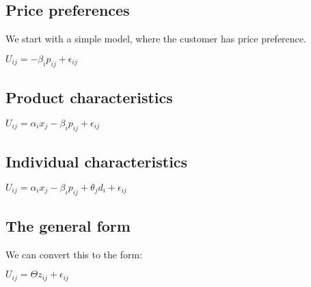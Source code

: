 
\subsection{Price preferences}

We start with a simple model, where the customer has price preference.

\(U_{ij}=-\beta_i p_{ij} +\epsilon_{ij}\)

\subsection{Product characteristics}

\(U_{ij}=\alpha_i x_j -\beta_i p_{ij} +\epsilon_{ij}\)

\subsection{Individual characteristics}

\(U_{ij}=\alpha_i x_j -\beta_i p_{ij} + \theta_j d_i +\epsilon_{ij}\)

\subsection{The general form}

We can convert this to the form:

\(U_{ij}=\Theta z_{ij} + \epsilon_{ij}\)

